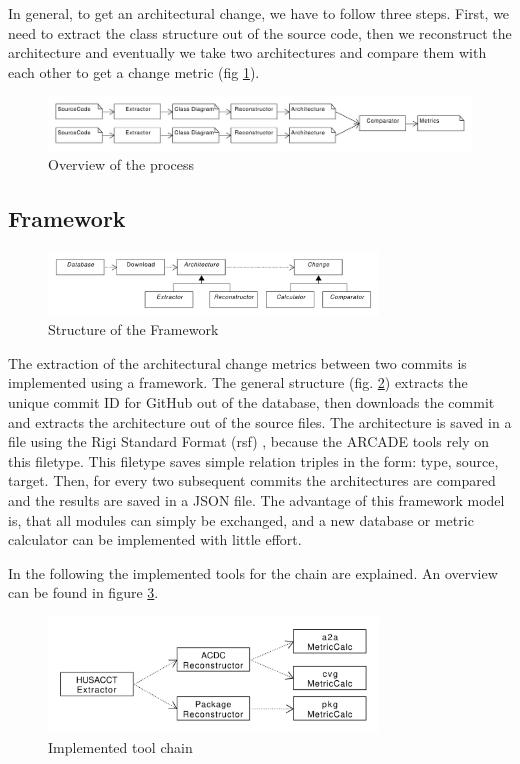 \documentclass[conference]{IEEEtran}
\begin{document}
In general, to get an architectural change, we have to follow three steps. First, we need to extract the class structure out of the source code, then we reconstruct the architecture and eventually we take two architectures and compare them with each other to get a change metric (fig \ref{overview}).

\begin{figure}
	\centering
	\includegraphics[width=7in]{assets/overview.pdf}
	\caption{Overview of the process}
	\label{overview}
\end{figure}


\subsection{Framework}

\begin{figure}
	\centering
	\includegraphics[width=3.45in]{assets/architecture.pdf}
	\caption{Structure of the Framework}
	\label{frameworkStructure}
\end{figure}

The extraction of the architectural change metrics between two commits is implemented using a framework. The general structure (fig. \ref{frameworkStructure}) extracts the unique commit ID for GitHub out of the database, then downloads the commit and extracts the architecture out of the source files. The architecture is saved in a file using the Rigi Standard Format (rsf) \cite{RSF}, because the ARCADE tools rely on this filetype. This filetype saves simple relation triples in the form: type, source, target. Then, for every two subsequent commits the architectures are compared and the results are saved in a JSON file. The advantage of this framework model is, that all modules can simply be exchanged, and a new database or metric calculator can be implemented with little effort.

In the following the implemented tools for the chain are explained. An overview can be found in figure \ref{implToolchain}.

\begin{figure}
	\centering
	\includegraphics[width=3.45in]{assets/implementedArc.pdf}
	\caption{Implemented tool chain}
	\label{implToolchain}
\end{figure}
\end{document}
